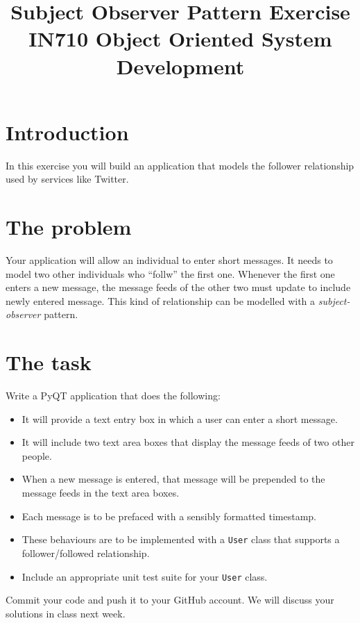 \documentclass{article}
\begin{document}
\title{Subject Observer Pattern Exercise\\IN710 Object Oriented System Development}
\date{}
\maketitle

\section*{Introduction}
In this exercise you will build an application that models the follower relationship
used by services like Twitter.

\section{The problem}
Your application will allow an individual to enter short messages.  It needs to
model two other individuals who ``follw'' the first one.  Whenever the first one
enters a new message, the message feeds of the other two must update to include 
newly entered message.  This kind of relationship can be modelled with a 
\emph{subject-observer} pattern.

\section{The task}
Write a PyQT application that does the following:

\begin{itemize}
	\item It will provide a text entry box in which a user
		can enter a short message.
	\item It will include two text area boxes that display
		the message feeds of two other people.
	\item When a new message is entered, that message
		will be prepended to the message feeds
		in the text area boxes.
	\item Each message is to be prefaced with a sensibly
		formatted timestamp.
	\item These behaviours are to be implemented with a 
		\texttt{User} class that supports a 
		follower/followed relationship.
	\item Include an appropriate unit test suite
		for your \texttt{User} class.
\end{itemize}

Commit your code and push it to your GitHub account.  We will
discuss your solutions in class next week.
\end{document}

